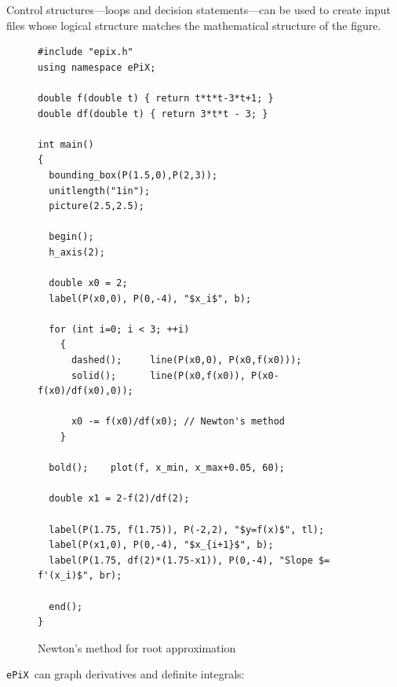 \documentclass[11pt]{article}
\newcommand{\ePiX}{\texttt{ePiX}}
\begin{document}
\clearpage

\noindent Control structures---loops and decision statements---can be
used to create input files whose logical structure matches the
mathematical structure of the figure.

\begin{figure}[hbt]
\begin{center}

\vspace*{-2.5in}
\begin{footnotesize}
\begin{verbatim}
#include "epix.h"
using namespace ePiX;

double f(double t) { return t*t*t-3*t+1; }
double df(double t) { return 3*t*t - 3; }

int main() 
{
  bounding_box(P(1.5,0),P(2,3));
  unitlength("1in");
  picture(2.5,2.5);

  begin();
  h_axis(2);

  double x0 = 2;
  label(P(x0,0), P(0,-4), "$x_i$", b);

  for (int i=0; i < 3; ++i)
    {
      dashed();     line(P(x0,0), P(x0,f(x0)));
      solid();      line(P(x0,f(x0)), P(x0-f(x0)/df(x0),0));

      x0 -= f(x0)/df(x0); // Newton's method
    }

  bold();    plot(f, x_min, x_max+0.05, 60);

  double x1 = 2-f(2)/df(2);

  label(P(1.75, f(1.75)), P(-2,2), "$y=f(x)$", tl);
  label(P(x1,0), P(0,-4), "$x_{i+1}$", b);
  label(P(1.75, df(2)*(1.75-x1)), P(0,-4), "Slope $= f'(x_i)$", br);

  end();
}
\end{verbatim}
\end{footnotesize}
\caption{Newton's method for root approximation}
\label{fig:newton}
\end{center}
\end{figure}

\clearpage

\noindent\ePiX\ can graph derivatives and definite integrals:
\end{document}
